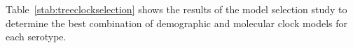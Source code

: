 \documentclass[a4paper,10pt]{article}
\begin{document}
% 
% 

Table~\ref{stab:treeclockselection} shows the results of the model selection study to determine the best combination of demographic and molecular clock models for each serotype.
\end{document}
